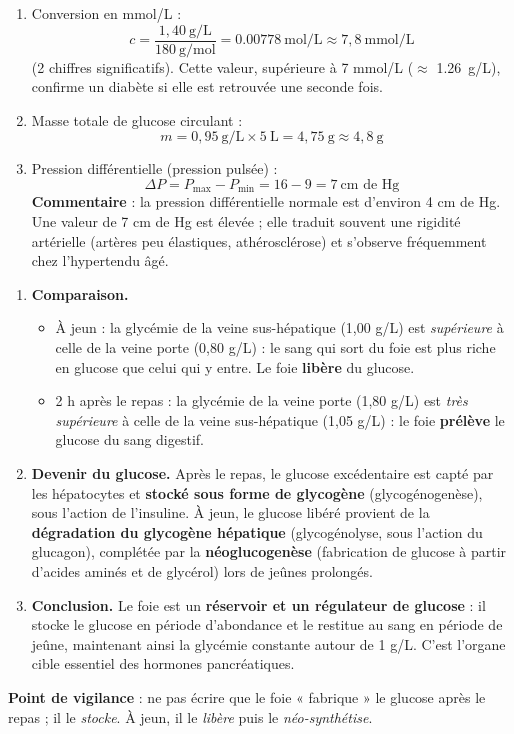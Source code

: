 \documentclass[11pt]{article}
\begin{document}
\begin{corrige}
\begin{enumerate}
\item Conversion en mmol/L :
\[ c = \frac{1,40 \ \text{g/L}}{180 \ \text{g/mol}} = \num{0,00778} \ \text{mol/L} \approx \boxed{7,8 \ \text{mmol/L}} \]
(2 chiffres significatifs). Cette valeur, supérieure à 7 mmol/L ($\approx$ \SI{1,26}{g/L}), confirme un diabète si elle est retrouvée une seconde fois.
\item Masse totale de glucose circulant :
\[ m = 0,95 \ \text{g/L} \times 5 \ \text{L} = \boxed{4,75 \ \text{g} \approx 4,8 \ \text{g}} \]
\item Pression différentielle (pression pulsée) :
\[ \Delta P = P_{\text{max}} - P_{\text{min}} = 16 - 9 = \boxed{7 \ \text{cm de Hg}} \]
\textbf{Commentaire} : la pression différentielle normale est d'environ 4 cm de Hg. Une valeur de 7 cm de Hg est élevée ; elle traduit souvent une rigidité artérielle (artères peu élastiques, athérosclérose) et s'observe fréquemment chez l'hypertendu âgé.
\end{enumerate}
\end{corrige}

\begin{corrige}
\begin{enumerate}
\item \textbf{Comparaison.}
\begin{itemize}
\item À jeun : la glycémie de la veine sus-hépatique (1,00 g/L) est \emph{supérieure} à celle de la veine porte (0,80 g/L) : le sang qui sort du foie est plus riche en glucose que celui qui y entre. Le foie \textbf{libère} du glucose.
\item 2 h après le repas : la glycémie de la veine porte (1,80 g/L) est \emph{très supérieure} à celle de la veine sus-hépatique (1,05 g/L) : le foie \textbf{prélève} le glucose du sang digestif.
\end{itemize}
\item \textbf{Devenir du glucose.} Après le repas, le glucose excédentaire est capté par les hépatocytes et \textbf{stocké sous forme de glycogène} (glycogénogenèse), sous l'action de l'insuline. À jeun, le glucose libéré provient de la \textbf{dégradation du glycogène hépatique} (glycogénolyse, sous l'action du glucagon), complétée par la \textbf{néoglucogenèse} (fabrication de glucose à partir d'acides aminés et de glycérol) lors de jeûnes prolongés.
\item \textbf{Conclusion.} Le foie est un \textbf{réservoir et un régulateur de glucose} : il stocke le glucose en période d'abondance et le restitue au sang en période de jeûne, maintenant ainsi la glycémie constante autour de 1 g/L. C'est l'organe cible essentiel des hormones pancréatiques.
\end{enumerate}
\textbf{Point de vigilance} : ne pas écrire que le foie « fabrique » le glucose après le repas ; il le \emph{stocke}. À jeun, il le \emph{libère} puis le \emph{néo-synthétise}.
\end{corrige}
\end{document}
